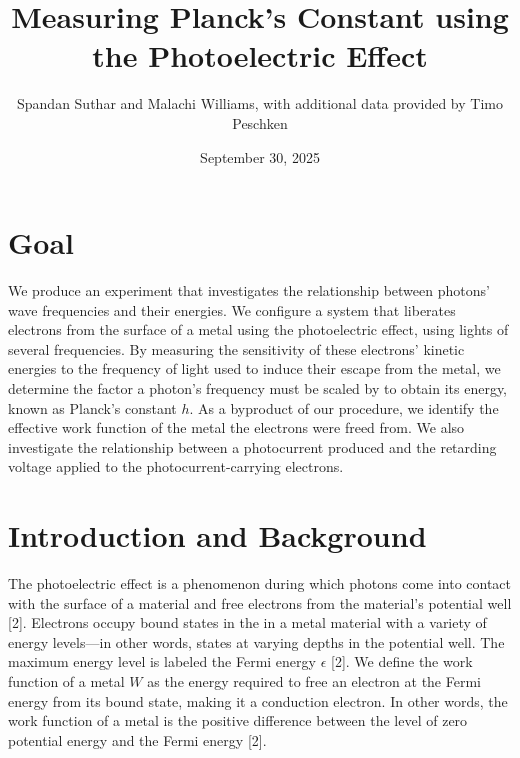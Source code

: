 \documentclass[11pt]{article}
\title{Measuring Planck’s Constant using the Photoelectric Effect}
\author{Spandan Suthar and Malachi Williams, with additional data
provided by Timo Peschken}
\date{September 30, 2025}
\begin{document}
\maketitle

\section{Goal}

We produce an experiment that investigates the relationship between
photons' wave frequencies and their energies. We configure a system
that liberates electrons from the surface of a metal using the
photoelectric effect, using lights of several frequencies. By
measuring the sensitivity of these electrons' kinetic energies to the
frequency of light used to induce their escape from the metal, we
determine the factor a photon's frequency must be scaled by to obtain
its energy, known as Planck's constant $h$. As a byproduct of our
procedure, we identify the effective work function of the metal
the electrons were freed from. We also investigate the relationship between
a photocurrent produced and the retarding voltage applied to the
photocurrent-carrying electrons.

\section{Introduction and Background}

The photoelectric effect is a phenomenon during which photons come into
contact with the surface of a material and free electrons from the
material's potential well [2]. Electrons occupy bound states in the
in a metal material with a variety of energy levels---in other words, states at
varying depths in the potential well. The maximum energy level is labeled the
Fermi energy $\epsilon$ [2]. We define the work function of a metal $W$
as the energy required to free an electron at the Fermi energy from
its bound state, making it a conduction electron. In other words, the work
function of a metal is the positive difference between the level of
zero potential energy and the Fermi energy [2].


\vspace{1em}
\end{document}
